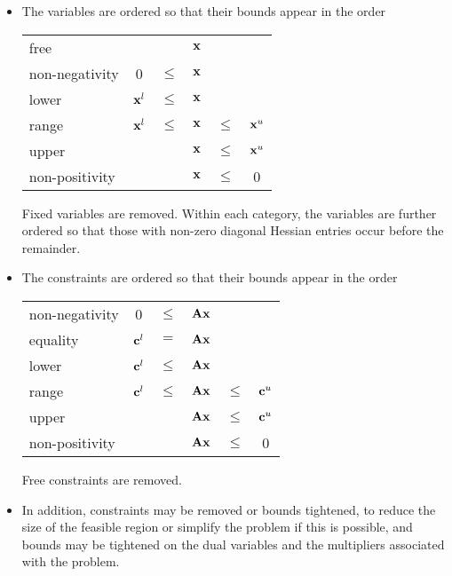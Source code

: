 \documentclass{galahad}
\begin{document}
\begin{itemize}
\item The variables are ordered so that their bounds appear in the order
\begin{center}
\begin{tabular}{lccccc}
free                &          &        & ${\mathbf{x}}$ &        &          \\
non-negativity      &   0      & $\leq$ & ${\mathbf{x}}$ &        &          \\
lower               & ${\mathbf{x}}^l$ & $\leq$ & ${\mathbf{x}}$ &        &          \\
range               & ${\mathbf{x}}^l$ & $\leq$ & ${\mathbf{x}}$ & $\leq$ & ${\mathbf{x}}^u$ \\
upper               &          &        & ${\mathbf{x}}$ & $\leq$ & ${\mathbf{x}}^u$ \\
non-positivity      &          &        & ${\mathbf{x}}$ & $\leq$ &      0   \\
\end{tabular}
\end{center}

Fixed variables are removed. Within each category, the variables 
are further ordered so that those with non-zero diagonal Hessian 
entries occur before the remainder.

\item
The constraints are ordered so that their bounds appear in the order
\begin{center}
\begin{tabular}{lccccc}
non-negativity      &     0    & $\leq$ & ${\mathbf{A}} {\mathbf{x}}$ &        &          \\
equality            & ${\mathbf{c}}^l$ &   $=$  & ${\mathbf{A}} {\mathbf{x}}$ &        &          \\
lower               & ${\mathbf{c}}^l$ & $\leq$ & ${\mathbf{A}} {\mathbf{x}}$ &        &          \\
range               & ${\mathbf{c}}^l$ & $\leq$ & ${\mathbf{A}} {\mathbf{x}}$ & $\leq$ & ${\mathbf{c}}^u$ \\
upper               &          &        & ${\mathbf{A}} {\mathbf{x}}$ & $\leq$ & ${\mathbf{c}}^u$ \\
non-positivity      &          &        & ${\mathbf{A}} {\mathbf{x}}$ & $\leq$ &     0    \\
\end{tabular}
\end{center}
Free constraints are removed. 

\item
In addition, constraints may be removed or bounds tightened, to reduce the
size of the feasible region or simplify the problem if this is possible, and
bounds may be tightened on the dual variables and the multipliers 
associated  with the problem. 
\end{itemize}
\end{document}
